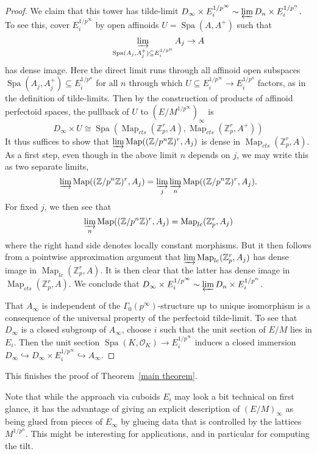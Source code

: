 \documentclass[10pt,oneside]{amsart}
\theoremstyle{definition}
\begin{document}
\begin{proof}
	 We claim that this tower has tilde-limit $D_\infty\times E_i^{1/p^\infty} \sim \varprojlim D_n\times E_i^{1/p^n}$.
	 To see this, cover $E_i^{1/p^\infty}$ by open affinoids $U=\operatorname{Spa}(A,A^{+})$ such that 
	 \[\varinjlim_{\operatorname{Spa}(A_{j},A_{j}^{+})\subseteq E_i^{1/p^n}} A_{j} \rightarrow A \]
	 has dense image. Here the direct limit runs through all affinoid open subspaces $\operatorname{Spa}(A_{j},A_{j}^{+})\subseteq E_i^{1/p^n}$ for all $n$ through which $U\subseteq E_i^{1/p^\infty}\rightarrow E_i^{1/p^n}$ factors, as in the definition of tilde-limits. Then by the construction of products of affinoid perfectoid spaces, the pullback of $U$ to $(E/M^{1/p^\infty})_\infty$ is 
	\[D_\infty\times U \cong \operatorname{Spa}(\operatorname{Map}_{cts}(\mathbb Z_p^r,A),\operatorname{Map}_{cts}(\mathbb Z_p^r,A^+))\]
	 It thus suffices to show that $\varinjlim \operatorname{Map}((\mathbb Z/p^n\mathbb Z)^r,A_{j})$ is dense in $\operatorname{Map}_{cts}(\mathbb Z_p^r,A)$.
	 As a first step, even though in the above limit $n$ depends on $j$, we may write this as two separate limits, 
	 \[\varinjlim \operatorname{Map}((\mathbb Z/p^n\mathbb Z)^r,A_{j}) = \varinjlim_{j} \varinjlim_n \operatorname{Map}(\mathbb (\mathbb Z/p^n\mathbb Z)^r,A_{j}).\]
	 For fixed $j$, we then see that 
	 \[\varinjlim_{n} \operatorname{Map}((\mathbb Z/p^n\mathbb Z)^r,A_j)=\operatorname{Map}_{lc}(\mathbb Z_p^r,A_j)\] where the right hand side denotes locally constant morphisms. But it then follows from a pointwise approximation argument that $\varinjlim\operatorname{Map}_{lc}(\mathbb Z_p^r,A_j)$ has dense image in $\operatorname{Map}_{lc}(\mathbb Z_p^r,A)$. It is then clear that the latter has dense image in $\operatorname{Map}_{cts}(\mathbb Z_p^r,A)$. We conclude that $D_\infty\times E_i^{1/p^\infty} \sim \varprojlim D_n\times E_i^{1/p^n}$.
	 
	That $A_\infty$ is independent of the $\Gamma_0(p^\infty)$-structure up to unique isomorphism is a consequence of the universal property of the perfectoid tilde-limit. To see that $D_\infty$ is a closed subgroup of $A_\infty$, choose $i$ such that the unit section of $E/M$ lies in $E_i$. Then the unit section $\operatorname{Spa}(K,\mathcal O_K)\rightarrow E_i^{1/p^\infty}$ induces a closed immersion $D_\infty\hookrightarrow D_\infty \times E_i^{1/p^\infty}\hookrightarrow A_\infty$.
	\end{proof}
	
	This finishes the proof of Theorem~\ref{main theorem}.
	
	Note that while the approach via cuboids $E_i$ may look a bit technical on first glance, it has the advantage of giving an explicit description of $(E/M)_\infty$ as being glued from pieces of $E_\infty$ by glueing data that is controlled by the lattices $M^{1/p^n}$. This might be interesting for applications, and in particular for computing the tilt. 
	
\end{document}
